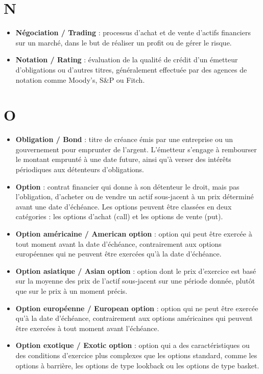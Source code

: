 \documentclass[a4paper,10pt]{article}
\begin{document}
\begin{multicols}{2}
\section*{N}
\begin{itemize}
  \item \textbf{Négociation / Trading} : processus d’achat et de vente d’actifs financiers sur un marché, dans le but de réaliser un profit ou de gérer le risque.
  \item \textbf{Notation / Rating} : évaluation de la qualité de crédit d’un émetteur d’obligations ou d’autres titres, généralement effectuée par des agences de notation comme Moody’s, S\&P ou Fitch.
\end{itemize}

\section*{O}
\begin{itemize}
  \item \textbf{Obligation / Bond} : titre de créance émis par une entreprise ou un gouvernement pour emprunter de l’argent. L’émetteur s’engage à rembourser le montant emprunté à une date future, ainsi qu’à verser des intérêts périodiques aux détenteurs d’obligations.
  \item \textbf{Option} : contrat financier qui donne à son détenteur le droit, mais pas l’obligation, d’acheter ou de vendre un actif sous-jacent à un prix déterminé avant une date d’échéance. Les options peuvent être classées en deux catégories : les options d’achat (call) et les options de vente (put).
  \item \textbf{Option américaine / American option} : option qui peut être exercée à tout moment avant la date d’échéance, contrairement aux options européennes qui ne peuvent être exercées qu’à la date d’échéance.
  \item \textbf{Option asiatique / Asian option} : option dont le prix d’exercice est basé sur la moyenne des prix de l’actif sous-jacent sur une période donnée, plutôt que sur le prix à un moment précis.
  \item \textbf{Option européenne / European option} : option qui ne peut être exercée qu’à la date d’échéance, contrairement aux options américaines qui peuvent être exercées à tout moment avant l’échéance.
  \item \textbf{Option exotique / Exotic option} : option qui a des caractéristiques ou des conditions d’exercice plus complexes que les options standard, comme les options à barrière, les options de type lookback ou les options de type basket.

\end{itemize}
\end{multicols}
\end{document}
